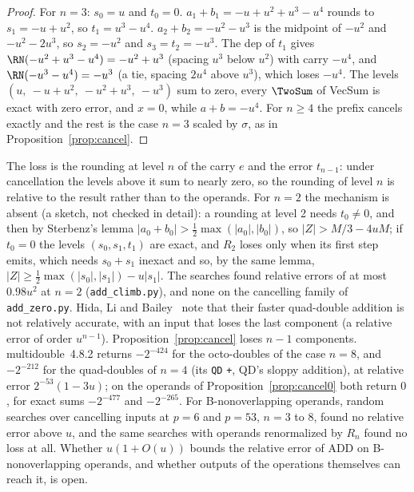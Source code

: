 \begin{proof}
For $n = 3$: $s_0 = u$ and $t_0 = 0$. $a_1 + b_1 = -u + u^2 + u^3 - u^4$ rounds to $s_1 = -u + u^2$, so $t_1 = u^3 - u^4$.
$a_2 + b_2 = -u^2 - u^3$ is the midpoint of $-u^2$ and $-u^2 - 2u^3$, so $s_2 = -u^2$ and $s_3 = t_2 = -u^3$. The dep of
$t_1$ gives $\RN(-u^2 + u^3 - u^4) = -u^2 + u^3$ (spacing $u^3$ below $u^2$) with carry $-u^4$, and $\RN(-u^3 - u^4) =
-u^3$ (a tie, spacing $2u^4$ above $u^3$), which loses $-u^4$. The levels $(u,\ -u + u^2,\ -u^2 + u^3,\ -u^3)$ sum to
zero, every $\TwoSum$ of VecSum is exact with zero error, and $x = 0$, while $a + b = -u^4$. For $n \ge 4$ the prefix
cancels exactly and the rest is the case $n = 3$ scaled by $\sigma$, as in Proposition~\ref{prop:cancel}.
\end{proof}

\begin{remark}
The loss is the rounding at level $n$ of the carry $e$ and the error $t_{n-1}$: under cancellation the levels above
it sum to nearly zero, so the rounding of level $n$ is relative to the result rather than to the operands. For $n = 2$
the mechanism is absent (a sketch, not checked in detail): a rounding at level 2 needs $t_0 \ne 0$, and then by
Sterbenz's lemma $|a_0 + b_0| > \frac12\max(|a_0|, |b_0|)$, so $|Z| > M/3 - 4uM$; if $t_0 = 0$ the levels $(s_0, s_1,
t_1)$ are exact, and $R_2$ loses only when its first step emits, which needs $s_0 + s_1$ inexact and so, by the same
lemma, $|Z| \ge \frac12\max(|s_0|, |s_1|) - u|s_1|$. The searches found relative errors of at most $0.98u^2$ at $n = 2$
(\texttt{add\_climb.py}), and none on the cancelling family of \texttt{add\_zero.py}. Hida, Li and Bailey~\cite{HLB01} note that
their faster quad-double addition is not relatively accurate, with an input that loses the last component (a relative
error of order $u^{n-1}$). Proposition~\ref{prop:cancel} loses $n - 1$ components. multidouble~4.8.2 returns
$-2^{-424}$ for the octo-doubles of the case $n = 8$, and $-2^{-212}$ for the quad-doubles of $n = 4$ (its \texttt{QD}
\texttt{+}, QD's sloppy addition), at relative error $2^{-53}(1 - 3u)$; on the operands of
Proposition~\ref{prop:cancel0} both return $0$, for exact sums $-2^{-477}$ and $-2^{-265}$. For B-nonoverlapping operands,
random searches over cancelling inputs at $p = 6$ and $p = 53$, $n = 3$ to $8$, found no relative error above $u$, and the
same searches with operands renormalized by $R_n$ found no loss at all. Whether $u(1 + O(u))$ bounds the relative error
of ADD on B-nonoverlapping operands, and whether outputs of the operations themselves can reach it, is open.
\end{remark}
